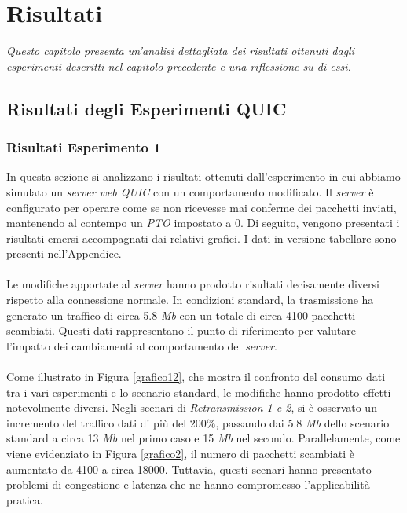\chapter{Risultati}
\label{cap:risultati}

\textit{\indent Questo capitolo presenta un'analisi dettagliata dei risultati ottenuti dagli esperimenti descritti nel capitolo precedente e una riflessione su di essi.}

\section{Risultati degli Esperimenti QUIC}
\subsection{Risultati Esperimento 1}
In questa sezione si analizzano i risultati ottenuti dall'esperimento in cui abbiamo simulato un \emph{server web QUIC} con un comportamento modificato. 
Il \emph{server} è configurato per operare come se non ricevesse mai conferme dei pacchetti inviati, mantenendo al contempo un \emph{PTO} impostato a 0. 
Di seguito, vengono presentati i risultati emersi accompagnati dai relativi grafici. I dati in versione tabellare sono presenti nell'Appendice.
\\\\
Le modifiche apportate al \emph{server} hanno prodotto risultati decisamente diversi rispetto alla connessione normale. 
In condizioni standard, la trasmissione ha generato un traffico di circa 5.8 \emph{Mb} con un totale di circa 4100 pacchetti scambiati. 
Questi dati rappresentano il punto di riferimento per valutare l'impatto dei cambiamenti al comportamento del \emph{server}.
\\\\
Come illustrato in Figura \ref{grafico12}, che mostra il confronto del consumo dati tra i vari esperimenti e lo scenario standard, le modifiche hanno prodotto effetti notevolmente diversi.
Negli scenari di \emph{Retransmission 1 e 2}, si è osservato un incremento del traffico dati di più del $200\%$, passando dai 5.8 \emph{Mb} dello scenario standard a circa 13 \emph{Mb} nel primo caso e 15 \emph{Mb} nel secondo. 
Parallelamente, come viene evidenziato in Figura \ref{grafico2}, il numero di pacchetti scambiati è aumentato da 4100 a circa 18000. 
Tuttavia, questi scenari hanno presentato problemi di congestione e latenza che ne hanno compromesso l'applicabilità pratica.
\\\\
